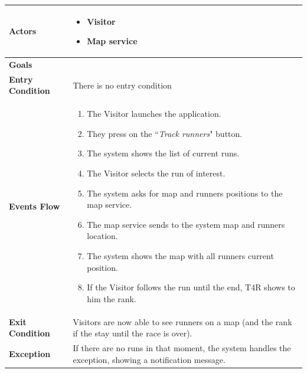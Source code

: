             \begin{table}[H]
            	\centering
                
                \begin{tabular}{|p{3cm}|p{8.2cm}|}
                    \hline
                    \textbf{Actors} & \begin{itemize}
                                            \item Visitor
                                            \item Map service
                                        \end{itemize} \\
                     \hline
                    \textbf{Goals} & \\ 
                     \hline
                    \textbf{Entry Condition} & There is no entry condition \\
                     \hline
                    \textbf{Events Flow} & \begin{enumerate}
                                                \item The Visitor launches the application.
                                                \item They press on the ``\emph{Track runners}" button.
                                                \item The system shows the list of current runs.
                                                \item The Visitor selects the run of interest.
                                                \item The system asks for map and runners positions to the map service.
                                                \item The map service sends to the system map and runners location.
                                                \item The system shows the map with all runners current position.
                                                \item If the Visitor follows the run until the end, T4R shows to him the rank.
                                            \end{enumerate} \\
                     \hline
                    \textbf{Exit Condition} & Visitors are now able to see runners on a map (and the rank if the stay until the race is over). \\
                     \hline
                    \textbf{Exception} & If there are no runs in that moment, the system handles the exception, showing a notification message. \\
                     \hline
                \end{tabular}  
            \end{table}
            
